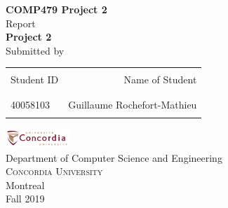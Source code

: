 \begin{titlepage}

    \begin{center}
    
    \textup{\small {\bf COMP479 Project 2} \\ Report}\\[0.2in]
    
    \Large \textbf {Project 2}\\[0.5in]
    
    \normalsize Submitted by \\
    \begin{table}[h]
    \centering
    \begin{tabular}{lr}\hline \\
    Student ID & Name of Student \\ \\ \hline
    \\
    40058103 & Guillaume Rochefort-Mathieu \\ \\ \hline 
    \end{tabular}
    \end{table}
    
    \vfill
    
    \includegraphics[width=0.18\textwidth]{./concordia}\\[0.1in]
    \Large{Department of Computer Science and Engineering}\\
    \normalsize
    \textsc{Concordia University}\\
    Montreal \\
    \vspace{0.2cm}
    Fall 2019
    
    \end{center}
    
    \end{titlepage}